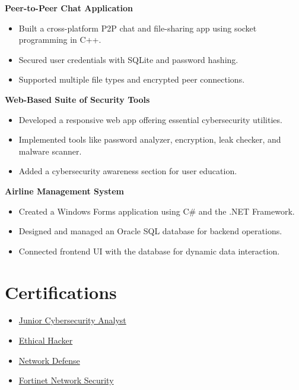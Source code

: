 \documentclass[a4paper,12pt]{article}
\begin{document}
\textbf{Peer-to-Peer Chat Application} 
\begin{itemize}[leftmargin=20pt, labelsep=5pt, itemsep=2pt, topsep=2pt]
\item Built a cross-platform P2P chat and file-sharing app using socket programming in C++.
\item Secured user credentials with SQLite and password hashing.
\item Supported multiple file types and encrypted peer connections.
\end{itemize}

\textbf{Web-Based Suite of Security Tools}
\begin{itemize}[leftmargin=20pt, labelsep=5pt, itemsep=2pt, topsep=2pt]
\item Developed a responsive web app offering essential cybersecurity utilities.
\item Implemented tools like password analyzer, encryption, leak checker, and malware scanner.
\item Added a cybersecurity awareness section for user education.
\end{itemize}

\textbf{Airline Management System}
\begin{itemize}[leftmargin=20pt, labelsep=5pt, itemsep=2pt, topsep=2pt]
\item Created a Windows Forms application using C\# and the .NET Framework.
\item Designed and managed an Oracle SQL database for backend operations.
\item Connected frontend UI with the database for dynamic data interaction.
\end{itemize}

\section{Certifications}
\begin{itemize}[leftmargin=20pt, labelsep=5pt, itemsep=2pt, topsep=2pt]
\item  \href{https://www.credly.com/badges/1796a68c-4d0f-48cd-ad0c-290dd0ac0ff4}{Junior Cybersecurity Analyst}
\item \href{https://www.credly.com/earner/earned/badge/bd051450-6ae1-4ae4-823a-59c213a1b78d}{Ethical Hacker}
\item \href{https://www.credly.com/badges/b545cced-c04d-49d6-a9d2-c7e3bd0eb49f}{Network Defense}
\item \href{https://www.coursera.org/account/accomplishments/specialization/SJSRYP1PUTYW}{Fortinet Network Security}
\end{itemize}
\end{document}
